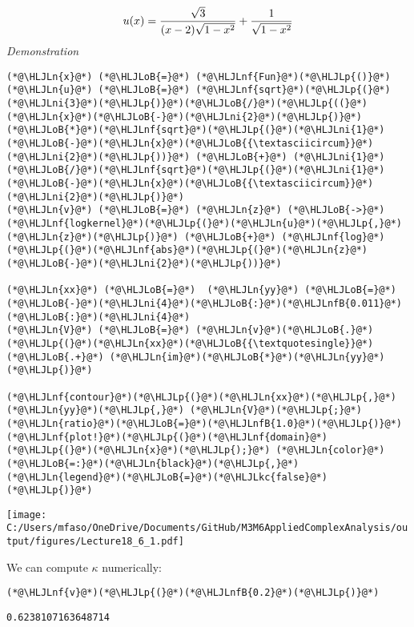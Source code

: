 \documentclass[12pt,landscape]{article}
\newcommand{\HLJLkc}[1]{\textcolor[RGB]{59,151,46}{\textit{#1}}}
\newcommand{\HLJLn}[1]{#1}
\newcommand{\HLJLnf}[1]{\textcolor[RGB]{66,102,213}{#1}}
\newcommand{\HLJLnfB}[1]{\textcolor[RGB]{59,151,46}{#1}}
\newcommand{\HLJLni}[1]{\textcolor[RGB]{59,151,46}{#1}}
\newcommand{\HLJLoB}[1]{\textcolor[RGB]{102,102,102}{\textbf{#1}}}
\newcommand{\HLJLp}[1]{#1}
\begin{document}
{\[
u(x) = {\sqrt{3} \over (x - 2) \sqrt{1-x^2}} + {1 \over \sqrt{1-x^2}}
\]
\emph{Demonstration}


\begin{lstlisting}
(*@\HLJLn{x}@*) (*@\HLJLoB{=}@*) (*@\HLJLnf{Fun}@*)(*@\HLJLp{()}@*)
(*@\HLJLn{u}@*) (*@\HLJLoB{=}@*) (*@\HLJLnf{sqrt}@*)(*@\HLJLp{(}@*)(*@\HLJLni{3}@*)(*@\HLJLp{)}@*)(*@\HLJLoB{/}@*)(*@\HLJLp{((}@*)(*@\HLJLn{x}@*)(*@\HLJLoB{-}@*)(*@\HLJLni{2}@*)(*@\HLJLp{)}@*)(*@\HLJLoB{*}@*)(*@\HLJLnf{sqrt}@*)(*@\HLJLp{(}@*)(*@\HLJLni{1}@*)(*@\HLJLoB{-}@*)(*@\HLJLn{x}@*)(*@\HLJLoB{{\textasciicircum}}@*)(*@\HLJLni{2}@*)(*@\HLJLp{))}@*) (*@\HLJLoB{+}@*) (*@\HLJLni{1}@*)(*@\HLJLoB{/}@*)(*@\HLJLnf{sqrt}@*)(*@\HLJLp{(}@*)(*@\HLJLni{1}@*)(*@\HLJLoB{-}@*)(*@\HLJLn{x}@*)(*@\HLJLoB{{\textasciicircum}}@*)(*@\HLJLni{2}@*)(*@\HLJLp{)}@*)
(*@\HLJLn{v}@*) (*@\HLJLoB{=}@*) (*@\HLJLn{z}@*) (*@\HLJLoB{->}@*) (*@\HLJLnf{logkernel}@*)(*@\HLJLp{(}@*)(*@\HLJLn{u}@*)(*@\HLJLp{,}@*) (*@\HLJLn{z}@*)(*@\HLJLp{)}@*) (*@\HLJLoB{+}@*) (*@\HLJLnf{log}@*)(*@\HLJLp{(}@*)(*@\HLJLnf{abs}@*)(*@\HLJLp{(}@*)(*@\HLJLn{z}@*)(*@\HLJLoB{-}@*)(*@\HLJLni{2}@*)(*@\HLJLp{))}@*)

(*@\HLJLn{xx}@*) (*@\HLJLoB{=}@*)  (*@\HLJLn{yy}@*) (*@\HLJLoB{=}@*) (*@\HLJLoB{-}@*)(*@\HLJLni{4}@*)(*@\HLJLoB{:}@*)(*@\HLJLnfB{0.011}@*)(*@\HLJLoB{:}@*)(*@\HLJLni{4}@*)
(*@\HLJLn{V}@*) (*@\HLJLoB{=}@*) (*@\HLJLn{v}@*)(*@\HLJLoB{.}@*)(*@\HLJLp{(}@*)(*@\HLJLn{xx}@*)(*@\HLJLoB{{\textquotesingle}}@*) (*@\HLJLoB{.+}@*) (*@\HLJLn{im}@*)(*@\HLJLoB{*}@*)(*@\HLJLn{yy}@*)(*@\HLJLp{)}@*)

(*@\HLJLnf{contour}@*)(*@\HLJLp{(}@*)(*@\HLJLn{xx}@*)(*@\HLJLp{,}@*) (*@\HLJLn{yy}@*)(*@\HLJLp{,}@*) (*@\HLJLn{V}@*)(*@\HLJLp{;}@*)(*@\HLJLn{ratio}@*)(*@\HLJLoB{=}@*)(*@\HLJLnfB{1.0}@*)(*@\HLJLp{)}@*)
(*@\HLJLnf{plot!}@*)(*@\HLJLp{(}@*)(*@\HLJLnf{domain}@*)(*@\HLJLp{(}@*)(*@\HLJLn{x}@*)(*@\HLJLp{);}@*) (*@\HLJLn{color}@*)(*@\HLJLoB{=:}@*)(*@\HLJLn{black}@*)(*@\HLJLp{,}@*) (*@\HLJLn{legend}@*)(*@\HLJLoB{=}@*)(*@\HLJLkc{false}@*)(*@\HLJLp{)}@*)
\end{lstlisting}

\texttt{[image: C:/Users/mfaso/OneDrive/Documents/GitHub/M3M6AppliedComplexAnalysis/output/figures/Lecture18\_6\_1.pdf]}

We can compute $\kappa$ numerically:


\begin{lstlisting}
(*@\HLJLnf{v}@*)(*@\HLJLp{(}@*)(*@\HLJLnfB{0.2}@*)(*@\HLJLp{)}@*)
\end{lstlisting}

\begin{lstlisting}
0.6238107163648714
\end{lstlisting}


}
\end{document}
